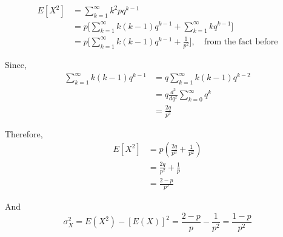 \documentclass[UTF8]{article}
\begin{document}
\begin{enumerate}
        \begin{equation*}
            \begin{split}
                E[X^2] &= \sum^\infty_{k=1}k^2pq^{k-1}\\
                &=p\bigg[\sum^\infty_{k=1}k(k-1)q^{k-1}+\sum^\infty_{k=1}kq^{k-1}\bigg]\\
                &=p\bigg[\sum^\infty_{k=1}k(k-1)q^{k-1}+\frac{1}{p^2}\bigg],\quad\text{from the fact before}
            \end{split}
        \end{equation*}

        Since,
        \begin{equation*}
            \begin{split}
                \sum^\infty_{k=1}k(k-1)q^{k-1} & =q\sum^\infty_{k=1}k(k-1)q^{k-2}\\
                &= q\frac{d^2}{dq^2}\sum^\infty_{k=0}q^k\\
                &=\frac{2q}{p^3}
            \end{split}
        \end{equation*}
        
        Therefore,
        \begin{equation*}
            \begin{split}
                E[X^2] &= p(\frac{2q}{p^3}+\frac{1}{p^2})\\
                &=\frac{2q}{p^2}+\frac{1}{p}\\
                &=\frac{2-p}{p^2}
            \end{split}
        \end{equation*}
        
        And
        \begin{equation*}
            \sigma^2_X=E(X^2)-[E(X)]^2=\frac{2-p}{p}-\frac{1}{p^2}=\frac{1-p}{p^2}
        \end{equation*}


\end{enumerate}
\end{document}
